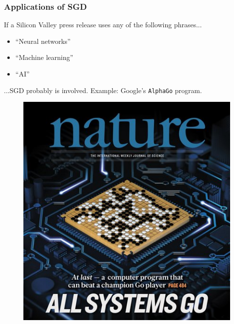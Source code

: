\documentclass{beamer}
\begin{document}
\begin{frame}
	\frametitle{Applications of SGD}
	If a Silicon Valley press release uses any of the following phrases...
	\begin{itemize}
		\item \small ``Neural networks''
		\item ``Machine learning''
		\item ``AI'' 
	\end{itemize}

	...SGD probably is involved. Example: Google's \texttt{AlphaGo} program.

	\begin{figure}[b]
	\centering
	\includegraphics[scale=0.33]{go}
	\end{figure}

\end{frame}
\end{document}
